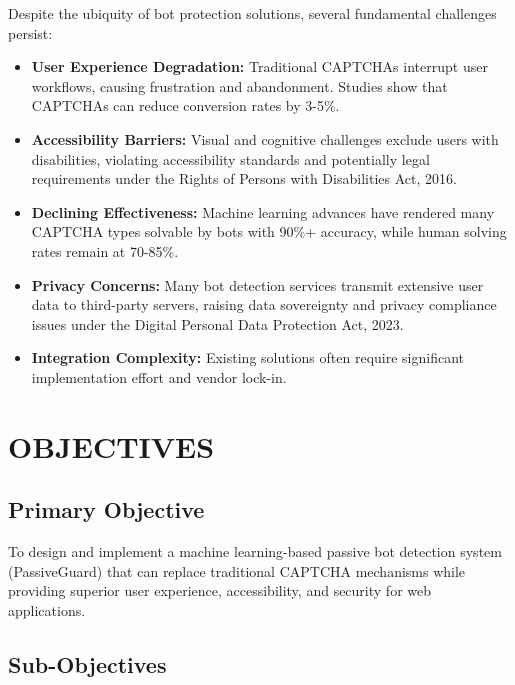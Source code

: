 Despite the ubiquity of bot protection solutions, several fundamental challenges persist:

\begin{itemize}
    \item \textbf{User Experience Degradation:} Traditional CAPTCHAs interrupt user workflows, causing frustration and abandonment. Studies show that CAPTCHAs can reduce conversion rates by 3-5\%.
    
    \item \textbf{Accessibility Barriers:} Visual and cognitive challenges exclude users with disabilities, violating accessibility standards and potentially legal requirements under the Rights of Persons with Disabilities Act, 2016.
    
    \item \textbf{Declining Effectiveness:} Machine learning advances have rendered many CAPTCHA types solvable by bots with 90\%+ accuracy, while human solving rates remain at 70-85\%.
    
    \item \textbf{Privacy Concerns:} Many bot detection services transmit extensive user data to third-party servers, raising data sovereignty and privacy compliance issues under the Digital Personal Data Protection Act, 2023.
    
    \item \textbf{Integration Complexity:} Existing solutions often require significant implementation effort and vendor lock-in.
\end{itemize}

\section{OBJECTIVES}

\subsection{Primary Objective}

To design and implement a machine learning-based passive bot detection system (PassiveGuard) that can replace traditional CAPTCHA mechanisms while providing superior user experience, accessibility, and security for web applications.

\subsection{Sub-Objectives}

